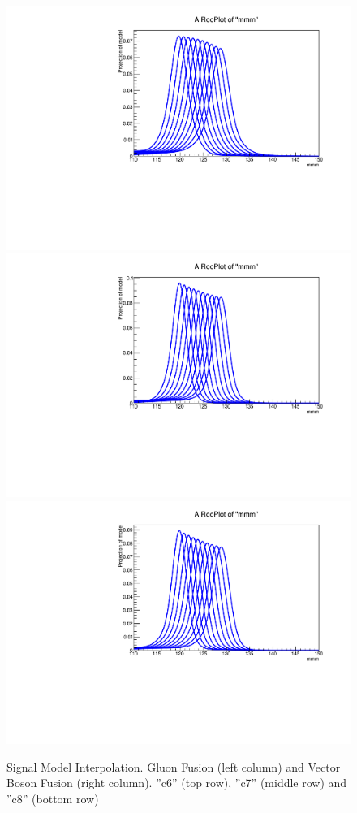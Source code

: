 \begin{figure}[hbp]
  \includegraphics[width=0.49\linewidth]{figures/signal_model/AppendixBdt/interpolation_VBF_cat7.pdf}\\
  \includegraphics[width=0.49\linewidth]{figures/signal_model/AppendixBdt/interpolation_GluGlu_cat8.pdf}
  \includegraphics[width=0.49\linewidth]{figures/signal_model/AppendixBdt/interpolation_VBF_cat8.pdf}
  \caption{Signal Model Interpolation. Gluon Fusion (left column) and Vector Boson Fusion (right column). ''c6'' (top row), ''c7'' (middle row) and ''c8'' (bottom row)}
  \label{fig:higgs_signalmodel_gluvbfc6c8}
\end{figure}
